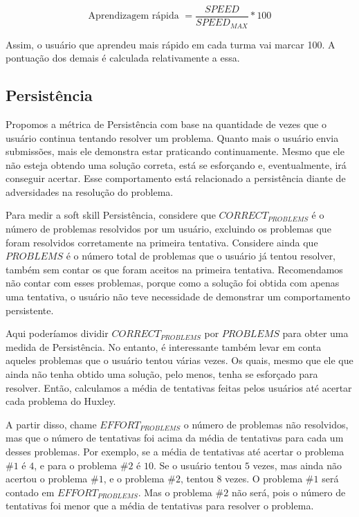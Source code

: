 \begin{equation} \label{m:aprendizagem}
\mbox{Aprendizagem rápida } = \frac{SPEED}{SPEED_{MAX}} * 100
\end{equation}

Assim, o usuário que aprendeu mais rápido em cada turma vai marcar 100. A pontuação dos demais é calculada relativamente a essa.

\subsection{Persistência}

Propomos a métrica de Persistência com base na quantidade de vezes que o usuário continua tentando resolver um problema. Quanto mais o usuário envia submissões, mais ele demonstra estar praticando continuamente. Mesmo que ele não esteja obtendo uma solução correta, está se esforçando e, eventualmente, irá conseguir acertar.
Esse comportamento está relacionado a persistência diante de adversidades na resolução do problema.


Para medir a soft skill Persistência, considere que $CORRECT_{PROBLEMS}$ é o número de problemas resolvidos por um usuário, excluindo os problemas que foram resolvidos corretamente na primeira tentativa. Considere ainda que $PROBLEMS$ é o número total de problemas que o usuário já tentou resolver, também sem contar os que foram aceitos na primeira tentativa. Recomendamos não contar com esses problemas, porque como a solução foi obtida com apenas uma tentativa, o usuário não teve necessidade de demonstrar um comportamento persistente.

Aqui poderíamos dividir $CORRECT_{PROBLEMS}$ por $PROBLEMS$ para obter uma medida de Persistência.
No entanto, é interessante também levar em conta aqueles problemas que o usuário tentou várias vezes. Os quais, mesmo que ele que ainda não tenha obtido uma solução, pelo menos, tenha se esforçado para resolver. Então, calculamos a média de tentativas feitas pelos usuários até acertar cada problema do Huxley.

A partir disso, chame $EFFORT_{PROBLEMS}$ o número de problemas não resolvidos, mas que o número de tentativas foi acima da média de tentativas para cada um desses problemas. 
Por exemplo, se a média de tentativas até acertar o problema $\#1$ é $4$, e para o problema $\#2$ é $10$. Se o usuário tentou $5$ vezes, mas ainda não acertou o problema $\#1$, e o problema $\#2$, tentou $8$ vezes. O problema $\#1$ será contado em $EFFORT_{PROBLEMS}$. Mas o problema $\#2$ não será, pois o número de tentativas foi menor que a média de tentativas para resolver o problema.

